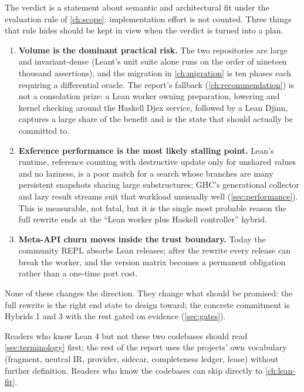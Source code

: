 \documentclass[10pt,letterpaper,oneside]{report}
\newcommand{\term}[1]{\textbf{#1}}
\begin{document}
\begin{riskbox}[title={How to read the verdict}]
The verdict is a statement about semantic and architectural fit under the evaluation rule of \autoref{ch:scope}: implementation effort is not counted. Three things that rule hides should be kept in view when the verdict is turned into a plan.
\begin{enumerate}
  \item \term{Volume is the dominant practical risk.} The two repositories are large and invariant-dense (Leant's unit suite alone runs on the order of nineteen thousand assertions), and the migration in \autoref{ch:migration} is ten phases each requiring a differential oracle. The report's fallback (\autoref{ch:recommendation}) is not a consolation prize: a Lean worker owning preparation, lowering and kernel checking around the Haskell Djex service, followed by a Lean Djinn, captures a large share of the benefit and is the state that should actually be committed to.
  \item \term{Exference performance is the most likely stalling point.} Lean's runtime, reference counting with destructive update only for unshared values and no laziness, is a poor match for a search whose branches are many persistent snapshots sharing large substructures; GHC's generational collector and lazy result streams suit that workload unusually well (\autoref{sec:performance}). This is measurable, not fatal, but it is the single most probable reason the full rewrite ends at the ``Lean worker plus Haskell controller'' hybrid.
  \item \term{Meta-API churn moves inside the trust boundary.} Today the community REPL absorbs Lean releases; after the rewrite every release can break the worker, and the version matrix becomes a permanent obligation rather than a one-time port cost.
\end{enumerate}
None of these changes the direction. They change what should be promised: the full rewrite is the right end state to design toward; the concrete commitment is Hybrids 1 and 3 with the rest gated on evidence (\autoref{sec:gates}).
\end{riskbox}

Readers who know Lean 4 but not these two codebases should read \autoref{sec:terminology} first; the rest of the report uses the projects' own vocabulary (fragment, neutral IR, provider, sidecar, completeness ledger, lease) without further definition. Readers who know the codebases can skip directly to \autoref{ch:lean-fit}.
\end{document}
